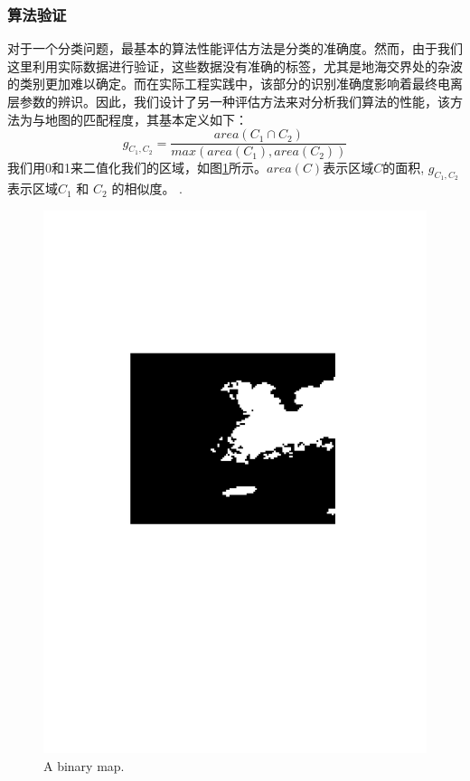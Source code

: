 \subsubsection{算法验证}
对于一个分类问题，最基本的算法性能评估方法是分类的准确度。然而，由于我们这里利用实际数据进行验证，这些数据没有准确的标签，尤其是地海交界处的杂波的类别更加难以确定。而在实际工程实践中，该部分的识别准确度影响着最终电离层参数的辨识。因此，我们设计了另一种评估方法来对分析我们算法的性能，该方法为与地图的匹配程度，其基本定义如下：
\begin{equation}
g_{C_1, C_2} = \frac{area({C_1\cap C_2})}{max(area({C_1}), area({C_2}))}
\end{equation}
我们用0和1来二值化我们的区域，如图\ref{fig:binary}所示。$area(C)$表示区域$C$的面积, $g_{C_1, C_2}$表示区域$C_1$ 和 $C_2$ 的相似度。 .
\begin{figure}
	\centering
	\includegraphics[height=0.25\textheight]{figures/binary}
	\caption{A binary map.}
	\label{fig:binary}
\end{figure}

